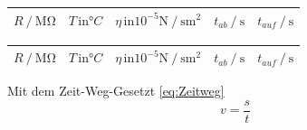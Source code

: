 \begin{table}[H]
\begin{minipage}[t]{1\textwidth}
\begin{table}[H]
\begin{tabular}{S S S S S}
              \bottomrule
            \end{tabular}
          \end{table}
        
    \end{minipage}\qquad
    \begin{minipage}[t]{1\textwidth}
        \small
        \label{stab:v225}
        \begin{table}[H]
            \centering
            \begin{tabular}{S S S S S}
              \toprule
                {$R \mathbin{/} \unit{\mega\ohm} $} & {$T \, \text{in} °C $} & {$\eta \, \text{in} 10^{-5} \unit{\newton}\mathbin{/} \unit{\second\meter}^2$}&{$ t_{ab} \mathbin{/} \unit{\second}$} & {$ t_{auf} \mathbin{/} \unit{\second}$}\\
              \midrule
              
              \bottomrule
            \end{tabular}
          \end{table}
        
    \end{minipage}\qquad
    \begin{minipage}[t]{1\textwidth}
        \small
        \label{stab:v250}
        \begin{table}[H]
            \centering
            \begin{tabular}{S S S S S}
              \toprule
                {$R \mathbin{/} \unit{\mega\ohm} $} & {$T \, \text{in} °C $} & {$\eta \, \text{in} 10^{-5} \unit{\newton}\mathbin{/} \unit{\second\meter}^2$}&{$ t_{ab} \mathbin{/} \unit{\second}$} & {$ t_{auf} \mathbin{/} \unit{\second}$}\\
              \midrule
              
              \bottomrule
            \end{tabular}
          \end{table}
    \end{minipage}
\end{table}
Mit dem Zeit-Weg-Gesetzt \eqref{eq:Zeitweg}
\begin{equation*}
  v = \dfrac{s}{t}
  \label{eq:Zeitweg}
\end{equation*}

